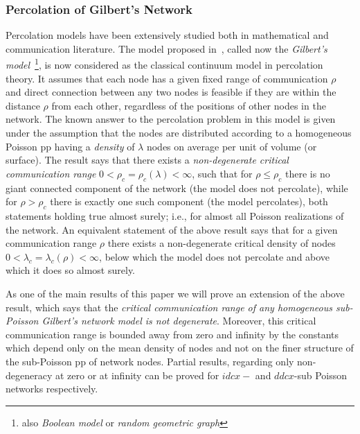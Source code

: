 \documentclass[conference]{IEEEtran}
\begin{document}
\subsubsection{Percolation of Gilbert's  Network}
\label{sss.Gilbert}
Percolation models have been extensively studied both in mathematical
and communication literature.
The model proposed in~\cite{Gilbert61},
called now the {\em Gilbert's model}~\footnote{also {\em Boolean
    model} or {\em random geometric graph}}, 
is now considered as the classical continuum model in
percolation theory. 
It assumes that each node 
has a given fixed range of communication $\rho$ and direct connection
between any two nodes is feasible if they are within the distance $\rho$ 
from  each other, regardless of the positions of other nodes in the network. 
The known answer  to the percolation problem in this model is  given  under
the assumption that the nodes are distributed according to a homogeneous 
Poisson pp having a {\em density} of $\lambda$ nodes on
average per unit of volume (or surface). The result   says that
there exists a {\em non-degenerate critical communication range}
$0<\rho_c=\rho_c(\lambda)<\infty$,
such that for $\rho\le \rho_c$ there is no giant connected
component of the network (the model does not  percolate), 
while for $\rho>\rho_c$ there is exactly one such
component (the model percolates), both statements holding true almost
surely; i.e., for 
almost all Poisson realizations of the network.
An equivalent statement of the above result says that for a given
communication  range $\rho$ there exists a non-degenerate
critical density of nodes
$0<\lambda_c=\lambda_c(\rho)<\infty$, below which the model does not
percolate and above which it does so almost surely. 

As one of the main results of this paper we will prove an extension of
the above result, which says that the {\em critical communication range of
any homogeneous sub-Poisson Gilbert's network model
is not degenerate}. Moreover,
this critical communication range is
bounded away from zero and infinity by the constants which depend only
on the mean density of nodes and not on the finer structure of the
sub-Poisson pp of network nodes. 
 Partial results, regarding only non-degeneracy
at zero or at infinity can be proved for $idcx-$ and
$ddcx$-sub Poisson networks respectively. 

  
\end{document}
